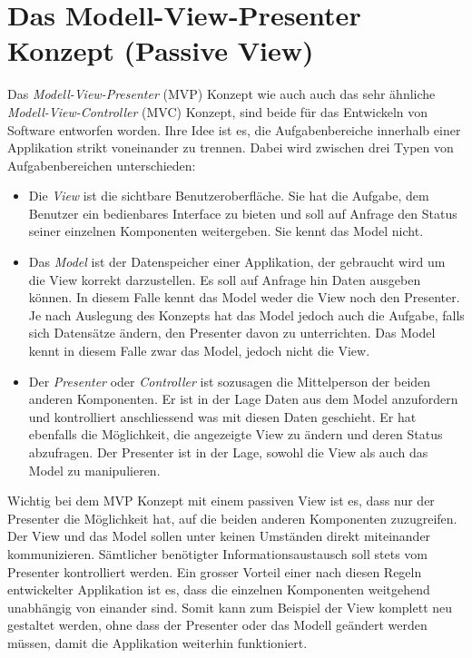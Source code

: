 \documentclass[../main.tex]{subfiles}
\begin{document}
\section{Das Modell-View-Presenter Konzept (Passive View)} \label{mvp}
Das \emph{Modell-View-Presenter} (MVP) Konzept wie auch auch das sehr ähnliche \emph{Modell-View-Controller} (MVC) Konzept, sind beide für das Entwickeln von Software entworfen worden. Ihre Idee ist es, die Aufgabenbereiche innerhalb einer Applikation strikt voneinander zu trennen. Dabei wird zwischen drei Typen von Aufgabenbereichen unterschieden:
\begin{itemize}
	\item Die \emph{View} ist die sichtbare Benutzeroberfläche. Sie hat die Aufgabe, dem Benutzer ein bedienbares Interface zu bieten und soll auf Anfrage den Status seiner einzelnen Komponenten weitergeben. Sie kennt das Model nicht.
	\item Das \emph{Model} ist der Datenspeicher einer Applikation, der gebraucht wird um die View korrekt darzustellen. Es soll auf Anfrage hin Daten ausgeben können. In diesem Falle kennt das Model weder die View noch den Presenter. Je nach Auslegung des Konzepts hat das Model jedoch auch die Aufgabe, falls sich Datensätze ändern, den Presenter davon zu unterrichten. Das Model kennt in diesem Falle zwar das Model, jedoch nicht die View.
	\item Der \emph{Presenter} oder \emph{Controller} ist sozusagen die Mittelperson der beiden anderen Komponenten. Er ist in der Lage Daten aus dem Model anzufordern und kontrolliert anschliessend was mit diesen Daten geschieht. Er hat ebenfalls die Möglichkeit, die angezeigte View zu ändern und deren Status abzufragen. Der Presenter ist in der Lage, sowohl die View als auch das Model zu manipulieren.
\end{itemize}
Wichtig bei dem MVP Konzept mit einem passiven View ist es, dass nur der Presenter die Möglichkeit hat, auf die beiden anderen Komponenten zuzugreifen. Der View und das Model sollen unter keinen Umständen direkt miteinander kommunizieren. Sämtlicher benötigter Informationsaustausch soll stets vom Presenter kontrolliert werden. \cite{mvp} Ein grosser Vorteil einer nach diesen Regeln entwickelter Applikation ist es, dass die einzelnen Komponenten weitgehend unabhängig von einander sind. Somit kann zum Beispiel der View komplett neu gestaltet werden, ohne dass der Presenter oder das Modell geändert werden müssen, damit die Applikation weiterhin funktioniert.
	
\end{document}
